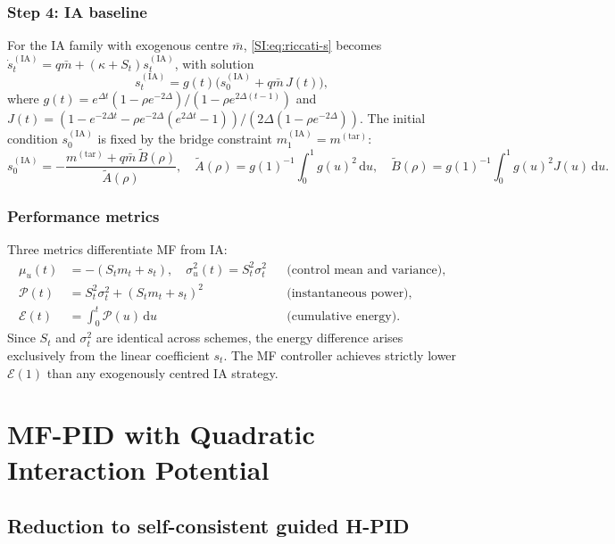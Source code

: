 \documentclass[11pt,onecolumn]{article}
\newcommand{\dd}{\mathrm{d}}
\newcommand{\calE}{\mathcal{E}}
\newcommand{\calP}{\mathcal{P}}
\newcommand{\IA}{\mathrm{IA}}
\begin{document}
\subsubsection{Step 4: IA baseline}
For the IA family with exogenous centre $\bar m$,
\eqref{SI:eq:riccati-s} becomes
$\dot s_t^{(\IA)} = q\bar m + (\kappa+S_t)s_t^{(\IA)}$,
with solution
\begin{equation}
  s_t^{(\IA)} = g(t)\bigl(s_0^{(\IA)} + q\bar m\,J(t)\bigr),
  \label{SI:eq:st-ia}
\end{equation}
where $g(t) = e^{\Delta t}(1-\rho e^{-2\Delta})/(1-\rho e^{2\Delta(t-1)})$
and $J(t) = (1-e^{-2\Delta t}-\rho e^{-2\Delta}(e^{2\Delta t}-1))/(2\Delta(1-\rho e^{-2\Delta}))$.
The initial condition $s_0^{(\IA)}$ is fixed by the bridge constraint
$m_1^{(\IA)} = m^{(\mathrm{tar})}$:
\begin{equation}
  s_0^{(\IA)} = -\frac{m^{(\mathrm{tar})} + q\bar m\,\tilde B(\rho)}{\tilde A(\rho)},
  \quad
  \tilde A(\rho) = g(1)^{-1}\!\int_0^1\!\!g(u)^2\,\dd u,
  \quad
  \tilde B(\rho) = g(1)^{-1}\!\int_0^1\!\!g(u)^2 J(u)\,\dd u.
  \label{SI:eq:s0-ia}
\end{equation}

\subsubsection{Performance metrics}
Three metrics differentiate MF from IA:
\begin{align}
  \mu_u(t) &= -(S_t m_t + s_t), \quad
  \sigma_u^2(t) = S_t^2\sigma_t^2
    && \text{(control mean and variance)},\\
  \calP(t) &= S_t^2\sigma_t^2 + (S_t m_t + s_t)^2
    && \text{(instantaneous power)},\\
  \calE(t) &= \int_0^t \calP(u)\,\dd u
    && \text{(cumulative energy)}.
\end{align}
Since $S_t$ and $\sigma_t^2$ are identical across schemes, the energy
difference arises exclusively from the linear coefficient $s_t$.
The MF controller achieves strictly lower $\calE(1)$ than any
exogenously centred IA strategy.

\section{MF-PID with Quadratic Interaction Potential}
\label{SI:quad}

\subsection{Reduction to self-consistent guided H-PID}
\label{SI:quad:reduction}
\end{document}
